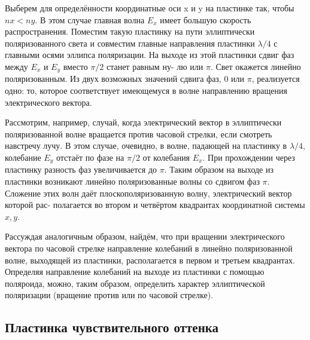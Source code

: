 \documentclass[14pt, a4paper]{report}
\begin{document}
Выберем для определённости координатные оси x и y на пластинке
так, чтобы $ nx < ny $. В этом случае главная волна $ E_x $ имеет большую
скорость распространения. Поместим такую пластинку на пути эллиптически поляризованного света и совместим главные направления пластинки $ \lambda/4 $ с главными осями эллипса поляризации. На выходе из этой
пластинки сдвиг фаз между $ E_x $ и $ E_y $ вместо $ \pi/2 $ станет равным ну-
лю или $ \pi $. Свет окажется линейно поляризованным. Из двух возможных значений сдвига фаз, 0 или $ \pi $, реализуется одно: то, которое соответствует имеющемуся в волне направлению вращения электрического вектора.

Рассмотрим, например, случай, когда электрический вектор в эллиптически поляризованной волне вращается против часовой стрелки,
если смотреть навстречу лучу. В этом случае, очевидно, в волне, падающей на пластинку в $ \lambda/4 $, колебание $ E_y $ отстаёт по фазе на $ \pi/2 $ от
колебания $ E_x $. При прохождении через пластинку разность фаз увеличивается до $ \pi $. Таким образом на выходе из пластинки возникают линейно поляризованные волны со сдвигом фаз $ \pi $. Сложение этих волн
даёт плоскополяризованную волну, электрический вектор которой рас-
полагается во втором и четвёртом квадрантах координатной системы
$ x, y $.

Рассуждая аналогичным образом, найдём, что при вращении электрического вектора по часовой стрелке направление колебаний в линейно поляризованной волне, выходящей из пластинки, располагается в первом и третьем квадрантах. Определяя направление колебаний на выходе из пластинки с помощью поляроида, можно, таким образом, определить характер эллиптической поляризации (вращение против или по часовой стрелке).

\subsection{Пластинка чувствительного оттенка}
\end{document}

